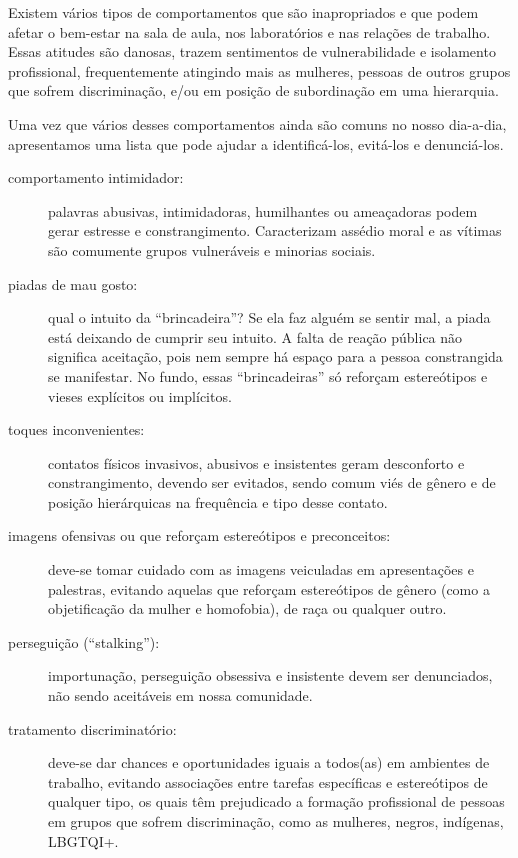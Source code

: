 \documentclass[twoside a4paper 12pt]{report}
\begin{document}
Existem vários tipos de comportamentos que são inapropriados e que podem afetar o bem-estar na sala de aula, nos laboratórios e nas relações de trabalho. Essas atitudes são danosas, trazem sentimentos de vulnerabilidade e isolamento profissional, frequentemente atingindo mais as mulheres, pessoas de outros grupos que sofrem discriminação, e/ou em posição de subordinação em uma hierarquia. 

Uma vez que vários desses comportamentos ainda são comuns no nosso dia-a-dia, apresentamos uma lista que pode ajudar a identificá-los, evitá-los e denunciá-los.

\begin{description}

\item[comportamento intimidador:] palavras abusivas, intimidadoras,
  humilhantes ou ameaçadoras podem gerar estresse e
  constrangimento. Caracterizam assédio moral e as vítimas são
  comumente grupos vulneráveis e minorias sociais.

\item[piadas de mau gosto:] qual o intuito da ``brincadeira''? Se ela
  faz alguém se sentir mal, a piada está deixando de cumprir seu
  intuito. A falta de reação pública não significa aceitação, pois nem
  sempre há espaço para a pessoa constrangida se manifestar. No fundo,
  essas “brincadeiras” só reforçam estereótipos e vieses explícitos ou
  implícitos.

\item[toques inconvenientes:] contatos físicos invasivos, abusivos e insistentes geram desconforto e constrangimento, devendo ser evitados, sendo comum viés de gênero e de posição hierárquicas na frequência e tipo desse contato.

\item[imagens ofensivas ou que reforçam estereótipos e preconceitos:] deve-se tomar cuidado com as imagens veiculadas em apresentações e palestras, evitando aquelas que reforçam estereótipos de gênero (como a objetificação da mulher e homofobia), de raça ou qualquer outro.

\item[perseguição (“stalking”):] importunação, perseguição obsessiva e insistente devem ser denunciados, não sendo aceitáveis em nossa comunidade.

\item[tratamento discriminatório:] deve-se dar chances e oportunidades iguais a todos(as) em ambientes de trabalho, evitando associações entre tarefas específicas e estereótipos de qualquer tipo, os quais têm prejudicado a formação profissional de pessoas em grupos que sofrem discriminação, como as mulheres, negros, indígenas, LBGTQI+. 
\end{description}
\end{document}
